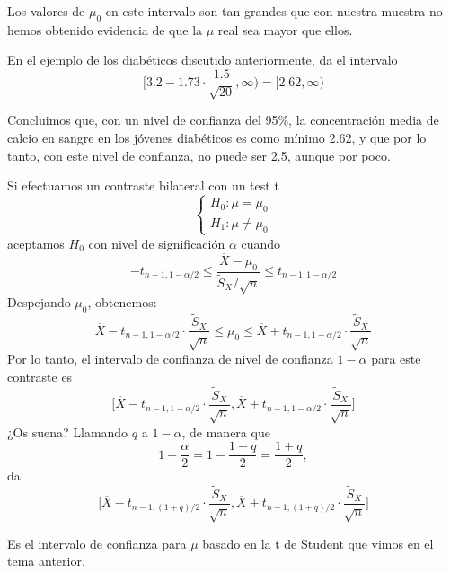 \documentclass[
  spanish,
  letterpaper,
  DIV=11,
  numbers=noendperiod]{scrreprt}
\begin{document}
Los valores de \(\mu_0\) en este intervalo son tan grandes que con
nuestra muestra no hemos obtenido evidencia de que la \(\mu\) real sea
mayor que ellos.

En el ejemplo de los diabéticos discutido anteriormente, da el intervalo
\[
\Bigg[3.2- 1.73\cdot \dfrac{1.5}{\sqrt{20}},\infty\Bigg)=[2.62,\infty)
\]

Concluimos que, con un nivel de confianza del 95\%, la concentración
media de calcio en sangre en los jóvenes diabéticos es como mínimo 2.62,
y que por lo tanto, con este nivel de confianza, no puede ser 2.5,
aunque por poco.

Si efectuamos un contraste bilateral con un test t \[
\left\{\begin{array}{l}
H_{0}:\mu=\mu_0\\ 
H_{1}:\mu
\neq \mu_0
\end{array}
\right.
\] aceptamos \(H_0\) con nivel de significación \(\alpha\) cuando \[
-t_{n-1,1-\alpha/2}\leqslant \dfrac{\overline{X}-\mu_0}{{\widetilde{S}_X}/{\sqrt{n}}}\leqslant t_{n-1,1-\alpha/2}
\] Despejando \(\mu_0\), obtenemos: \[
\overline{X}- t_{n-1,1-\alpha/2}\cdot \dfrac{\widetilde{S}_X}{\sqrt{n}}\leqslant \mu_0 \leqslant \overline{X}+ t_{n-1,1-\alpha/2}\cdot \dfrac{\widetilde{S}_X}{\sqrt{n}}
\] Por lo tanto, el intervalo de confianza de nivel de confianza
\(1-\alpha\) para este contraste es \[
\Bigg[\overline{X}- t_{n-1,1-\alpha/2}\cdot \dfrac{\widetilde{S}_X}{\sqrt{n}},\overline{X}+ t_{n-1,1-\alpha/2}\cdot \dfrac{\widetilde{S}_X}{\sqrt{n}}\Bigg]
\] ¿Os suena? Llamando \(q\) a \(1-\alpha\), de manera que \[
1-\frac{\alpha}{2}=1-\frac{1-q}{2}=\frac{1+q}{2},
\] da \[
\Bigg[\overline{X}- t_{n-1,(1+q)/2}\cdot \dfrac{\widetilde{S}_X}{\sqrt{n}},\overline{X}+ t_{n-1,(1+q)/2}\cdot \dfrac{\widetilde{S}_X}{\sqrt{n}}\Bigg]
\]

Es el intervalo de confianza para \(\mu\) basado en la t de Student que
vimos en el tema anterior.
\end{document}
